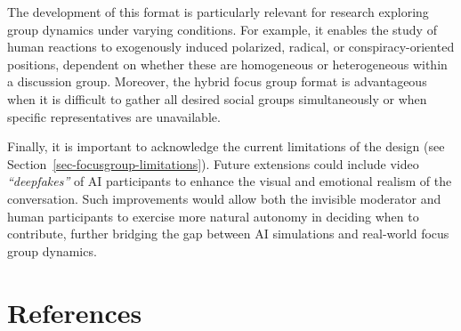\documentclass[
  letterpaper,
  DIV=11,
  numbers=noendperiod]{scrartcl}
\begin{document}
The development of this format is particularly relevant for research
exploring group dynamics under varying conditions. For example, it
enables the study of human reactions to exogenously induced polarized,
radical, or conspiracy-oriented positions, dependent on whether these
are homogeneous or heterogeneous within a discussion group. Moreover,
the hybrid focus group format is advantageous when it is difficult to
gather all desired social groups simultaneously or when specific
representatives are unavailable.

Finally, it is important to acknowledge the current limitations of the
design (see Section~\ref{sec-focusgroup-limitations}). Future extensions
could include video \emph{``deepfakes''} of AI participants to enhance
the visual and emotional realism of the conversation. Such improvements
would allow both the invisible moderator and human participants to
exercise more natural autonomy in deciding when to contribute, further
bridging the gap between AI simulations and real-world focus group
dynamics.

\section*{References}\label{sec:references}
\end{document}
